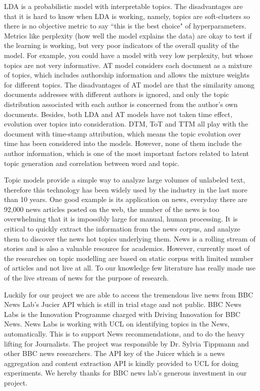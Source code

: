 LDA is a probabilistic model with interpretable topics. The disadvantages are that it is hard to know when LDA is working, namely, topics are soft-clusters so there is no objective metric to say ``this is the best choice" of hyperparameters. Metrics like perplexity (how well the model explains the data) are okay to test if the learning is working, but very poor indicators of the overall quality of the model. For example, you could have a model with very low perplexity, but whose topics are not very informative. AT model considers each document as a mixture of topics, which includes authorship  information  and  allows  the  mixture  weights  for  different  topics. The disadvantages of AT model are that the similarity among documents addresses with different authors is ignored, and only the topic distribution associated with each author is concerned from the author’s own documents. Besides, both LDA and AT models have not taken time effect, evolution over topics into consideration. DTM, ToT and TTM all play with the document with time-stamp attribution, which means the topic evolution over time has been considered into the models. However, none of them include the author information, which is one of the most important factors related to latent topic generation and correlation between word and topic.

Topic models provide a simple way to analyze large volumes of unlabeled text, therefore this technology has been widely used by the industry in the last more than 10 years. One good example is its application on news, everyday there are 92,000 news articles posted on the web, the number of the news is too overwhelming that it is impossibly large for manual, human processing. It is critical to quickly extract the information from the news corpus, and analyze them to discover the news hot topics underlying them. News is a rolling stream of stories  and is also a valuable resource for academics. However, currently most of the researches on topic modelling are based on static corpus with limited number of articles and not live at all. To our knowledge few literature has really made use of the live stream of news for the purpose of research.

Luckily for our project we are able to access the tremendous live news from BBC News Lab's Jucier API which is still in trial stage and not public. BBC News Labs is the Innovation Programme charged with Driving Innovation for BBC News. News Labs is working with UCL on identifying topics in the News, automatically. This is to support News recommendations, and to do the heavy lifting for Journalists. The project was responsible by Dr. Sylvia Tippmann and other BBC news researchers. The API key of the Juicer which is a news aggregation and content extraction API is kindly provided to UCL for doing experiments. We hereby thanks for BBC news lab's generous investment in our project.

